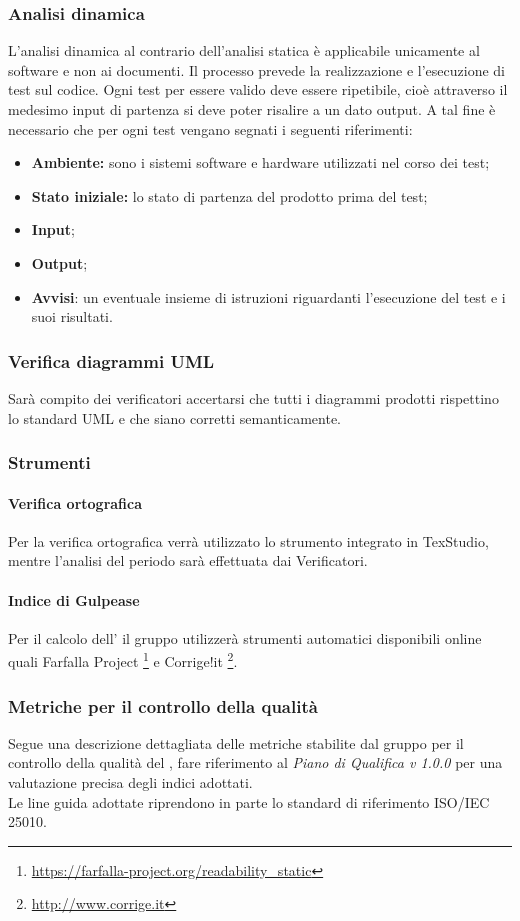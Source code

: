 \subsubsection{Analisi dinamica}
L'analisi dinamica al contrario dell'analisi statica è applicabile unicamente al software e non ai documenti. Il processo prevede la realizzazione e l'esecuzione di test sul codice. Ogni test per essere valido deve essere ripetibile, cioè attraverso il medesimo input di partenza si deve poter risalire a un dato output. A tal fine è necessario che per ogni test vengano segnati i seguenti riferimenti: 
\begin{itemize}
\item \textbf{Ambiente:} sono i sistemi software e hardware utilizzati nel corso dei test;
\item \textbf{Stato iniziale:} lo stato di partenza del prodotto prima del test;
\item \textbf{Input};
\item \textbf{Output};
\item \textbf{Avvisi}: un eventuale insieme di istruzioni riguardanti l'esecuzione del test e i suoi risultati.
\end{itemize}
\subsubsection{Verifica diagrammi UML}
Sarà compito dei verificatori accertarsi che tutti i diagrammi prodotti rispettino lo standard UML e che siano corretti semanticamente.
\subsubsection{Strumenti}
\paragraph{Verifica ortografica}
Per la verifica ortografica verrà utilizzato lo strumento integrato in TexStudio, mentre l'analisi del periodo sarà effettuata dai Verificatori.
\paragraph{Indice di Gulpease}
Per il calcolo dell' il gruppo utilizzerà strumenti automatici disponibili online quali Farfalla Project \footnote{\url{https://farfalla-project.org/readability_static}} e Corrige!it \footnote{\url{http://www.corrige.it}}.

\subsubsection{Metriche per il controllo della qualità}
Segue una descrizione dettagliata delle metriche stabilite dal gruppo per il controllo della qualità del , fare riferimento al \textit{Piano di Qualifica v 1.0.0} per una valutazione precisa degli indici adottati.\\
Le line guida adottate riprendono in parte lo standard di riferimento ISO/IEC 25010.

